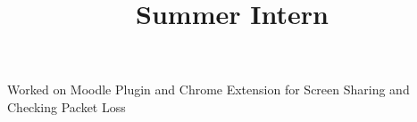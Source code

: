 \begin{resume}
\title{Summer Intern}
\begin{position}
Worked on Moodle Plugin and Chrome Extension for Screen Sharing and Checking Packet Loss
\end{position}












\end{resume}
